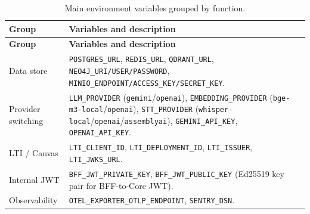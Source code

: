 \begin{longtable}{|p{3cm}|p{10.5cm}|}
\caption{Main environment variables grouped by function.}
\label{tab:env-vars} \\
\hline
\textbf{Group} & \textbf{Variables and description} \\
\hline
\endfirsthead
\hline
\textbf{Group} & \textbf{Variables and description} \\
\hline
\endhead

Data store
    & \texttt{POSTGRES\_URL}, \texttt{REDIS\_URL}, \texttt{QDRANT\_URL},
      \texttt{NEO4J\_URI/USER/PASSWORD},
      \texttt{MINIO\_ENDPOINT/ACCESS\_KEY/SECRET\_KEY}. \\
\hline
Provider switching
    & \texttt{LLM\_PROVIDER} (\texttt{gemini}/\texttt{openai}),
      \texttt{EMBEDDING\_PROVIDER}
      (\texttt{bge-m3-local}/\texttt{openai}),
      \texttt{STT\_PROVIDER}
      (\texttt{whisper-local}/\texttt{openai}/\texttt{assemblyai}),
      \texttt{GEMINI\_API\_KEY}, \texttt{OPENAI\_API\_KEY}. \\
\hline
LTI / Canvas
    & \texttt{LTI\_CLIENT\_ID}, \texttt{LTI\_DEPLOYMENT\_ID},
      \texttt{LTI\_ISSUER}, \texttt{LTI\_JWKS\_URL}. \\
\hline
Internal JWT
    & \texttt{BFF\_JWT\_PRIVATE\_KEY}, \texttt{BFF\_JWT\_PUBLIC\_KEY}
      (Ed25519 key pair for BFF-to-Core JWT). \\
\hline
Observability
    & \texttt{OTEL\_EXPORTER\_OTLP\_ENDPOINT}, \texttt{SENTRY\_DSN}. \\
\hline
\end{longtable}
